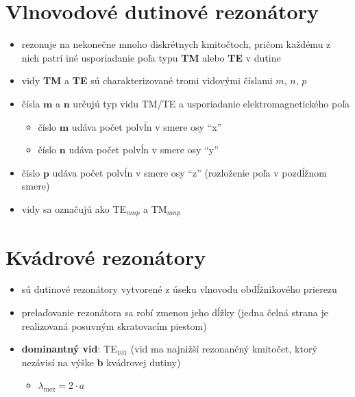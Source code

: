 	\section{Vlnovodové dutinové rezonátory}
	\begin{itemize}[label=--]
		\item rezonuje na nekonečne mnoho diskrétnych kmitočtoch, pričom každému z nich patrí iné usporiadanie poľa typu \textbf{TM} alebo \textbf{TE} v dutine
		\item vidy \textbf{TM} a \textbf{TE} sú charakterizované tromi vidovými číslami $m$, $n$, $p$
		\item čísla $\mathbf{m}$ a $\mathbf{n}$ určujú typ vidu TM/TE a usporiadanie elektromagnetického poľa
		\begin{itemize}[label=$\rightarrow$]
			\item číslo $\mathbf{m}$ udáva počet polvĺn v smere osy ``x''
			\item číslo $\mathbf{n}$ udáva počet polvĺn v smere osy ``y''
		\end{itemize}
		\item číslo $\mathbf{p}$ udáva počet polvĺn v smere osy ``z'' (rozloženie poľa v pozdĺžnom smere)
		\item vidy sa označujú ako TE$_{mnp}$ a TM$_{mnp}$
	\end{itemize}
	
	\section{Kvádrové rezonátory}
	\begin{itemize}[label=--]
		\item sú dutinové rezonátory vytvorené z úseku vlnovodu obdĺžnikového prierezu
		\item prelaďovanie rezonátora sa robí zmenou jeho dĺžky (jedna čelná strana je realizovaná posuvným skratovacím piestom)
		\item \textbf{dominantný vid}: TE$_{101}$ (vid ma najnižší rezonančný kmitočet, ktorý nezávisí na výške \textbf{b} kvádrovej dutiny)
		\begin{itemize}[label=$\rightarrow$]
			\item $\lambda_{\text{mez}} = 2\cdot a$
		\end{itemize}
	\end{itemize}	
	

